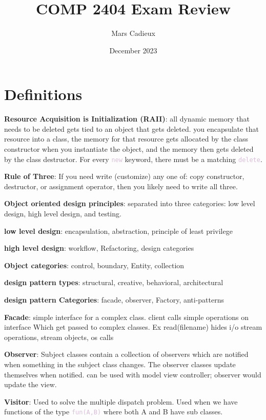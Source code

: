 \documentclass{article}
\title{COMP 2404 Exam Review}
\author{Mars Cadieux}
\date{December 2023}
\newcommand{\code}[1]{\textcolor{Thistle}{\texttt{#1}}}
\newcommand{\definition}[2]{\textbf{#1}: #2}
\begin{document}
{\selectfont

\maketitle

\section*{Definitions}

\definition{Resource Acquisition is Initialization (RAII)}{all dynamic memory that needs to be deleted gets tied to an object that gets deleted. you encapsulate that resource into a class, the memory for that resource gets allocated by the class constructor when you instantiate the object, and the memory then gets deleted by the class destructor. For every \code{new} keyword, there must be a matching \code{delete}.}

\definition{Rule of Three}{If you need write (customize) any one of: copy constructor, destructor, or assignment operator, then you likely need to write all three.}

\definition{Object oriented design principles}{separated into three categories: low level design, high level design, and testing.}

\definition{low level design}{encapsulation, abstraction, principle of least privilege}

\definition{high level design}{workflow, Refactoring, design categories}

\definition{Object categories}{control, boundary, Entity, collection}

\definition{design pattern types}{structural, creative, behavioral, architectural}

\definition{design pattern Categories}{facade, observer, Factory, anti-patterns}

\definition{Facade}{simple interface for a complex class. client calls simple operations on interface Which get passed to complex classes. Ex read(filename) hides i/o stream operations, stream objects, os calls}

\definition{Observer}{Subject classes contain a collection of observers which are notified when something in the subject class changes. The observer classes update themselves when notified. can be used with model view controller; observer would update the view.}

\definition{Visitor}{Used to solve the multiple dispatch problem. Used when we have functions of the type \code{fun(A,B)} where both A and B have sub classes.}

}
\end{document}
